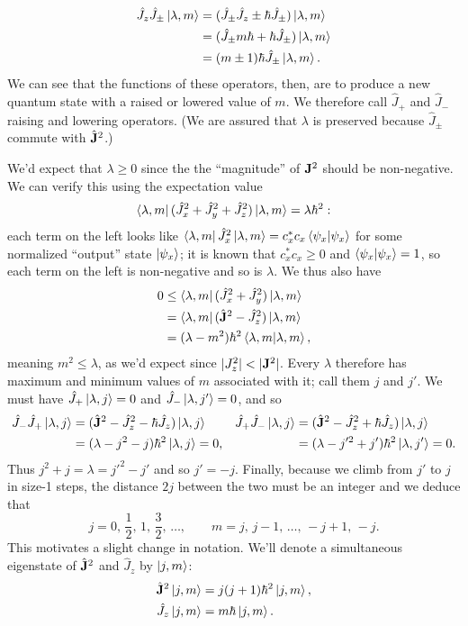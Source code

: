 \documentclass[../p116main.tex]{subfiles}
\begin{document}
\begin{align*}
    \hat J_z \hat J_\pm \left| \lambda, m \right> &= (\hat J_\pm \hat J_z \pm \hbar \hat J_\pm) \left| \lambda, m \right> \\
    &= (\hat J_\pm m\hbar + \hbar \hat J_\pm) \left| \lambda, m \right> \\
    &= (m \pm 1) \hbar \hat J_\pm \left| \lambda, m \right>.
\end{align*}
We can see that the functions of these operators, then, are to produce a new quantum state with a raised or lowered value of $m$.
We therefore call $\hat J_+$ and $\hat J_-$ raising and lowering operators.
(We are assured that $\lambda$ is preserved because $\hat J_\pm$ commute with $\hat{\mathbf{J}}^2$.)

We'd expect that $\lambda \geq 0$ since the the ``magnitude'' of $\mathbf{J}^2$ should be non-negative.
We can verify this using the expectation value
\[ \left< \lambda, m \right| (\hat J_x^2 + \hat J_y^2 + \hat J_z^2) \left| \lambda, m \right> = \lambda \hbar^2: \]
each term on the left looks like $\left< \lambda, m \right| \hat J_x^2 \left| \lambda, m \right> = c_x^*c_x \left< \psi_x \middle| \psi_x \right>$ for some normalized ``output'' state $\left| \psi_x \right>$; it is known that $c_x^* c_x \geq 0$ and $\left< \psi_x \middle| \psi_x \right> = 1$, so each term on the left is non-negative and so is $\lambda$.
We thus also have \vspace{-10pt}
\begin{align*}
    0 &\leq \left< \lambda, m \right| (\hat J_x^2 + \hat J_y^2) \left| \lambda, m \right> \\
    &= \left< \lambda, m \right| (\hat{\mathbf{J}}^2 - \hat J_z^2) \left| \lambda, m \right> \\
    &= (\lambda - m^2) \hbar^2 \left< \lambda, m \middle| \lambda, m \right>,
\end{align*}
meaning $m^2 \leq \lambda$, as we'd expect since $|J_z^2| < |\mathbf{J}^2|$.
Every $\lambda$ therefore has maximum and minimum values of $m$ associated with it; call them $j$ and $j'$.
We must have $\hat J_+ \left| \lambda, j \right> = 0$ and $\hat J_- \left| \lambda, j' \right> = 0$, and so
\begin{align*}
    \hat J_- \hat J_+ \left| \lambda, j \right> &= (\hat{\mathbf{J}}^2 - \hat J_z^2 - \hbar \hat J_z) \left| \lambda, j \right> & \hat J_+ \hat J_- \left| \lambda, j \right> &= (\hat{\mathbf{J}}^2 - \hat J_z^2 + \hbar \hat J_z) \left| \lambda, j \right> \\
    &= (\lambda - j^2 - j) \hbar^2 \left| \lambda, j \right> = 0, &&= (\lambda - j'^2 + j') \hbar^2 \left| \lambda, j' \right> = 0.
\end{align*}
Thus $j^2 + j = \lambda = j'^2 - j'$ and so $j' = -j$.
Finally, because we climb from $j'$ to $j$ in size-1 steps, the distance $2j$ between the two must be an integer and we deduce that
\[ j = 0,\, \frac{1}{2},\, 1,\, \frac{3}{2},\, \ldots, \qquad m = j, \, j-1,\, \ldots,\, -j+1,\, -j.  \]
This motivates a slight change in notation.
We'll denote a simultaneous eigenstate of $\hat{\mathbf{J}}^2$ and $\hat J_z$ by $\left| j, m \right>$:
\begin{align*}
    \hat{\mathbf{J}}^2 \left| j,m \right> &= j(j+1)\hbar^2 \left| j,m \right>, \\
    \hat J_z \left| j,m \right> &= m\hbar \left| j,m \right>.
\end{align*}
\end{document}
